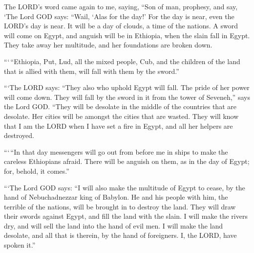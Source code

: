  The LORD's word came again to me, saying, 
``Son of man, prophesy, and say, `The Lord GOD says: ``Wail, `Alas for
the day!'  For the day is near, even the LORD's day is near.
It will be a day of clouds, a time of the nations.  A sword
will come on Egypt, and anguish will be in Ethiopia, when the slain fall
in Egypt. They take away her multitude, and her foundations are broken
down.

 ```\,``Ethiopia, Put, Lud, all the mixed people, Cub, and
the children of the land that is allied with them, will fall with them
by the sword.''

 ```The LORD says: ``They also who uphold Egypt will fall.
The pride of her power will come down. They will fall by the sword in it
from the tower of Seveneh,'' says the Lord GOD.  ``They will
be desolate in the middle of the countries that are desolate. Her cities
will be amongst the cities that are wasted.  They will know
that I am the LORD when I have set a fire in Egypt, and all her helpers
are destroyed.

 ```\,``In that day messengers will go out from before me in
ships to make the careless Ethiopians afraid. There will be anguish on
them, as in the day of Egypt; for, behold, it comes.''

 ```The Lord GOD says: ``I will also make the multitude of
Egypt to cease, by the hand of Nebuchadnezzar king of Babylon.
 He and his people with him, the terrible of the nations,
will be brought in to destroy the land. They will draw their swords
against Egypt, and fill the land with the slain.  I will
make the rivers dry, and will sell the land into the hand of evil men. I
will make the land desolate, and all that is therein, by the hand of
foreigners. I, the LORD, have spoken it.''

